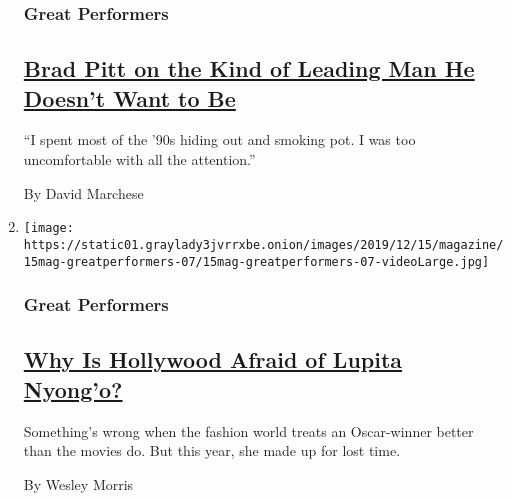 \begin{enumerate}
  \hypertarget{great-performers-2}{%
  \subsubsection{Great Performers}\label{great-performers-2}}

  \hypertarget{brad-pitt-on-the-kind-of-leading-man-he-doesnt-want-to-be}{%
  \subsection{\texorpdfstring{\href{/interactive/2019/12/09/magazine/brad-pitt-interview.html}{Brad
  Pitt on the Kind of Leading Man He Doesn't Want to
  Be}}{Brad Pitt on the Kind of Leading Man He Doesn't Want to Be}}\label{brad-pitt-on-the-kind-of-leading-man-he-doesnt-want-to-be}}

  ``I spent most of the '90s hiding out and smoking pot. I was too
  uncomfortable with all the attention.''

  By David Marchese
\item
  \texttt{[image: https://static01.graylady3jvrrxbe.onion/images/2019/12/15/magazine/15mag-greatperformers-07/15mag-greatperformers-07-videoLarge.jpg]}

  \hypertarget{great-performers-3}{%
  \subsubsection{Great Performers}\label{great-performers-3}}

  \hypertarget{why-is-hollywood-afraid-of-lupita-nyongo}{%
  \subsection{\texorpdfstring{\href{/interactive/2019/12/09/magazine/lupita-nyongo-us.html}{Why
  Is Hollywood Afraid of Lupita
  Nyong'o?}}{Why Is Hollywood Afraid of Lupita Nyong'o?}}\label{why-is-hollywood-afraid-of-lupita-nyongo}}

  Something's wrong when the fashion world treats an Oscar-winner better
  than the movies do. But this year, she made up for lost time.

  By Wesley Morris
\end{enumerate}

